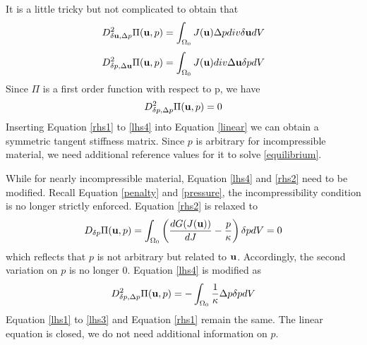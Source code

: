 It is a little tricky but not complicated to obtain that
\begin{equation} \label{lhs2}
D_{\delta\bold{u}, \Delta{p}}^2 \Pi(\bold{u}, p) = \int_{\Omega_0} J(\bold{u})\Delta{p}div\delta{\bold{u}}dV
\end{equation}
\begin{equation} \label{lhs3}
D_{\delta{p}, \Delta\bold{u}}^2 \Pi(\bold{u}, p) = \int_{\Omega_0} J(\bold{u})div\Delta{\bold{u}}\delta{p}dV
\end{equation}
Since $\Pi$ is a first order function with respect to p, we have
\begin{equation} \label{lhs4}
D_{\delta{p}, \Delta{p}}^2 \Pi(\bold{u}, p) = 0
\end{equation}
Inserting Equation \ref{rhs1} to \ref{lhs4} into Equation \ref{linear} we can obtain a symmetric tangent stiffness matrix. Since $p$ is arbitrary for incompressible material, we need additional reference values for it to solve \ref{equilibrium}.

While for nearly incompressible material, Equation \ref{lhs4} and \ref{rhs2} need to be modified. Recall Equation \ref{penalty} and \ref{pressure}, the incompressibility condition is no longer strictly enforced. Equation \ref{rhs2} is relaxed to
\begin{equation} \label{relation}
D_{\delta{p}}\Pi(\bold{u}, p) = \int_{\Omega_0}\left(  \frac{dG(J(\bold{u}))}{dJ} - \frac{p}{\kappa} \right)\delta{p}dV = 0
\end{equation}
which reflects that $p$ is not arbitrary but related to $\bold{u}$.  
Accordingly, the second variation on $p$ is no longer $0$. Equation \ref{lhs4} is modified as
\begin{equation} \label{lhs42}
D_{\delta{p}, \Delta{p}}^2 \Pi(\bold{u}, p) = - \int_{\Omega_0}\frac{1}{\kappa}\Delta{p}\delta{p}dV
\end{equation}
Equation \ref{lhs1} to \ref{lhs3} and Equation \ref{rhs1} remain the same. The linear equation is closed, we do not need additional information on $p$.


















